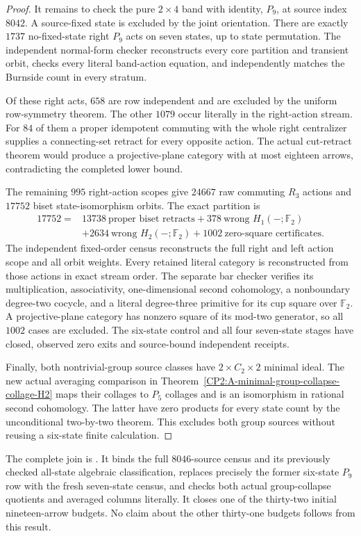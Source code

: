 \begin{proof}
It remains to check the pure $2\times4$ band with identity, $P_9$,
at source index $8042$.  A source-fixed state is excluded by the
joint orientation.  There are exactly $1737$ no-fixed-state right
$P_9$ acts on seven states, up to state permutation.  The independent
normal-form checker reconstructs every core partition and transient
orbit, checks every literal band-action equation, and independently
matches the Burnside count in every stratum.

Of these right acts, $658$ are row independent and are excluded by
the uniform row-symmetry theorem.  The other $1079$ occur literally
in the right-action stream.  For $84$ of them a proper idempotent
commuting with the whole right centralizer supplies a connecting-set
retract for every opposite action.  The actual cut-retract theorem
would produce a projective-plane category with at most eighteen
arrows, contradicting the completed lower bound.

The remaining $995$ right-action scopes give $24667$ raw commuting
$R_3$ actions and $17752$ biset state-isomorphism orbits.  The exact
partition is
\[
\begin{aligned}
17752={}&13738\ \text{proper biset retracts}
  +378\ \text{wrong }H_1(-;\mathbb F_2)\\
 &+2634\ \text{wrong }H_2(-;\mathbb F_2)
  +1002\ \text{zero-square certificates}.
\end{aligned}
\]
The independent fixed-order census reconstructs the full right and
left action scope and all orbit weights.  Every retained literal
category is reconstructed from those actions in exact stream order.
The separate bar checker verifies its multiplication, associativity,
one-dimensional second cohomology, a nonboundary degree-two cocycle,
and a literal degree-three primitive for its cup square over
$\mathbb F_2$.  A projective-plane category has nonzero square of
its mod-two generator, so all $1002$ cases are excluded.
The six-state control and all four seven-state stages have closed,
observed zero exits and source-bound independent receipts.

Finally, both nontrivial-group source classes have $2\times C_2\times2$
minimal ideal.  The new actual averaging comparison in
Theorem~\ref{CP2:A-minimal-group-collapse-collage-H2} maps their
collages to $P_5$ collages and is an isomorphism in rational second
cohomology.  The latter have zero products for every state count by
the unconditional two-by-two theorem.  This excludes both group
sources without reusing a six-state finite calculation.
\end{proof}

\begin{remark*}
The complete join is
.
It binds the full $8046$-source census and its previously checked
all-state algebraic classification, replaces precisely the former
six-state $P_9$ row with the fresh seven-state census, and checks both
actual group-collapse quotients and averaged columns literally.
It closes one of the thirty-two initial nineteen-arrow budgets.
No claim about the other thirty-one budgets follows from this result.
\end{remark*}
